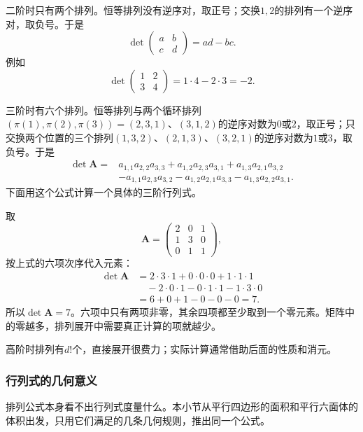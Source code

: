 二阶时只有两个排列。恒等排列没有逆序对，取正号；交换$1,2$的排列有一个逆序对，取负号。于是
\begin{equation}
 \det\begin{pmatrix}a&b\\c&d\end{pmatrix}=ad-bc.
 \label{eq:ls-det-two-by-two}
\end{equation}
例如
\[
 \det\begin{pmatrix}1&2\\3&4\end{pmatrix}=1\cdot4-2\cdot3=-2.
\]

三阶时有六个排列。恒等排列与两个循环排列$(\pi(1),\pi(2),\pi(3))=(2,3,1)$、$(3,1,2)$的逆序对数为$0$或$2$，取正号；只交换两个位置的三个排列$(1,3,2)$、$(2,1,3)$、$(3,2,1)$的逆序对数为$1$或$3$，取负号。于是
\[
 \begin{aligned}
 \det\bm A={}&a_{1,1}a_{2,2}a_{3,3}+a_{1,2}a_{2,3}a_{3,1}+a_{1,3}a_{2,1}a_{3,2}\\
 &-a_{1,1}a_{2,3}a_{3,2}-a_{1,2}a_{2,1}a_{3,3}-a_{1,3}a_{2,2}a_{3,1}.
 \end{aligned}
\]
下面用这个公式计算一个具体的三阶行列式。
\begin{example}[三阶行列式的排列展开]
\label{ex:ls-det-three-by-three}
取
\[
 \bm A=\begin{pmatrix}2&0&1\\1&3&0\\0&1&1\end{pmatrix},
\]
按上式的六项次序代入元素：
\[
 \begin{aligned}
 \det\bm A&=2\cdot3\cdot1+0\cdot0\cdot0+1\cdot1\cdot1\\
 &\quad-2\cdot0\cdot1-0\cdot1\cdot1-1\cdot3\cdot0\\
 &=6+0+1-0-0-0=7.
 \end{aligned}
\]
所以$\det\bm A=7$。六项中只有两项非零，其余四项都至少取到一个零元素。矩阵中的零越多，排列展开中需要真正计算的项就越少。
\end{example}
高阶时排列有$d!$个，直接展开很费力；实际计算通常借助后面的性质和消元。

\subsubsection{行列式的几何意义}

排列公式本身看不出行列式度量什么。本小节从平行四边形的面积和平行六面体的体积出发，只用它们满足的几条几何规则，推出同一个公式。

